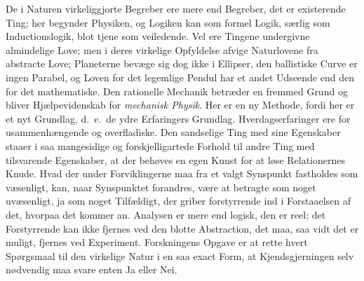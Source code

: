 \documentclass[12pt]{book}
\newcommand{\apage}[1]{\marginnote{\footnotesize\textit{[#1]}}}
\begin{document}
\noindent De i Naturen virkeliggjorte Begreber ere mere end Begreber, det
er existerende Ting; her begynder Physiken, og Logiken kan som formel
Logik, særlig som Inductionslogik, blot tjene som veiledende. Vel ere
Tingene undergivne almindelige Love; men i deres virkelige Opfyldelse
afvige Naturlovene fra abstracte Love; Planeterne bevæge sig dog ikke i
Ellipser, den ballistiske Curve er ingen Parabel, og Loven for det
legemlige Pendul har et andet Udseende end den for det mathematiske. Den
rationelle Mechanik betræder en fremmed Grund og bliver Hjælpevidenskab for
\emph{mechanisk Physik}. Her er en ny Methode, fordi her er et nyt Grundlag, d.\ e.\
de ydre Erfaringers Grundlag. Hverdagserfaringer ere for  \apage{136} usammenhængende og
overfladiske. Den sandselige Ting med sine Egenskaber staaer i saa
mangesidige og forskjelligartede Forhold til andre Ting med tilsvarende
Egenskaber, at der behøves en egen Kunst for at løse Relationernes Knude.
Hvad der under Forviklingerne maa fra et valgt Synspunkt fastholdes som
væsenligt, kan, naar Synspunktet forandres, være at betragte som noget
uvæsenligt, ja som noget Tilfældigt, der griber forstyrrende ind i
Forstaaelsen af det, hvorpaa det kommer an. Analysen er mere end logisk,
den er reel; det Forstyrrende kan ikke fjernes ved den blotte Abstraction,
det maa, saa vidt det er muligt, fjernes ved Experiment. Forskningens
Opgave er at rette hvert Spørgsmaal til den virkelige Natur i en saa exact
Form, at Kjendsgjerningen selv nødvendig maa svare enten Ja eller Nei.
\end{document}
